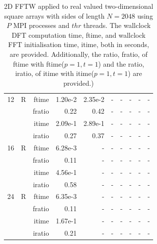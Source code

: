 \documentclass[a4paper]{article}
\begin{document}
\begin{table}[htbp]
\begin{center}
\begin{small}
\begin{tabular}{|r|r|r|r|r|r|r|r|r|r|}
   12 &   R &   ftime &   1.20e-2 &    2.35e-2 &   - &   - &   - &   - &   - \\
           &            &  fratio &   0.22 &    0.42 &   - &   - &   - &   - &   - \\
           &            &  itime &   2.09e-1 &    2.89e-1 &   - &   - &   - &   - &   - \\
           &            &  iratio &   0.27 &    0.37 &   - &   - &   - &   - &   - \\\hline
   16 &   R &   ftime &   6.28e-3 &   - &   - &   - &   - &   - &   - \\
           &            &  fratio &   0.11 &   - &   - &   - &   - &   - &   - \\
           &            &  itime &   4.56e-1 &   - &   - &   - &   - &   - &   - \\
           &            &  iratio &   0.58 &   - &   - &   - &   - &   - &   - \\\hline
   24 &   R &   ftime &   6.35e-3 &   - &   - &   - &   - &   - &   - \\
           &            &  fratio &   0.11 &   - &   - &   - &   - &   - &   - \\
           &            &  itime &   1.67e-1 &   - &   - &   - &   - &   - &   - \\
           &            &  iratio &   0.21 &   - &   - &   - &   - &   - &   - \\\hline
\end{tabular}
\caption{2D FFTW applied to real valued two-dimensional square arrays with sides of length $N=2048$ using $P$ MPI processes and $thr$ threads. The wallclock DFT computation time, ftime, and wallclock FFT initialisation time, itime, both in seconds, are provided. Additionally, the ratio, fratio, of ftime  with ftime($p=1,t=1$) and the ratio, iratio, of itime  with itime($p=1,t=1$) are provided.) }\label{Tbl:FFTW2d2048}
\end{small}
\end{center}
\end{table}
\end{document}
